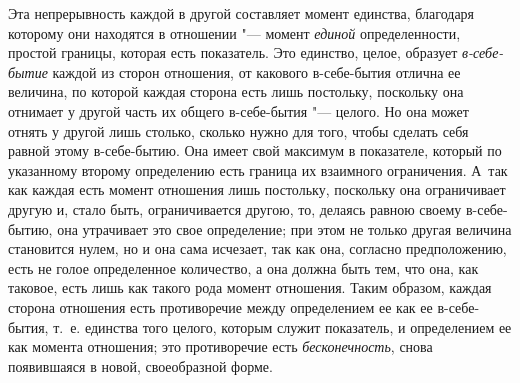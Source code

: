 Эта непрерывность каждой в другой составляет момент единства, благодаря
которому они находятся в отношении "--- момент
{\em единой} определенности, простой границы, которая
есть показатель. Это единство, целое, образует
{\em в-себе-бытие} каждой из сторон отношения, от
какового в-себе-бытия отлична ее {}
величина, по которой каждая сторона есть лишь постольку, поскольку она
отнимает у другой часть их общего в-себе-бытия "--- целого. Но она может
отнять у другой лишь столько, сколько нужно для того, чтобы сделать себя
равной этому в-себе-бытию. Она имеет свой максимум в показателе, который по
указанному второму определению есть граница их взаимного ограничения. А~так
как каждая есть момент отношения лишь постольку, поскольку она ограничивает
другую и, стало быть, ограничивается другою, то, делаясь равною своему
в-себе-бытию, она утрачивает это свое определение; при этом не только
другая величина становится
нулем,
но и она сама исчезает, так как она, согласно предположению, есть не голое
определенное количество, а она должна быть тем, что она, как таковое, есть
лишь как такого рода момент отношения. Таким образом, каждая сторона
отношения есть противоречие между определением ее как ее
в-себе-бытия, т.~е. единства того целого, которым служит показатель, и
определением ее как момента отношения; это противоречие есть
{\em бесконечность}, снова появившаяся в новой,
своеобразной форме.

